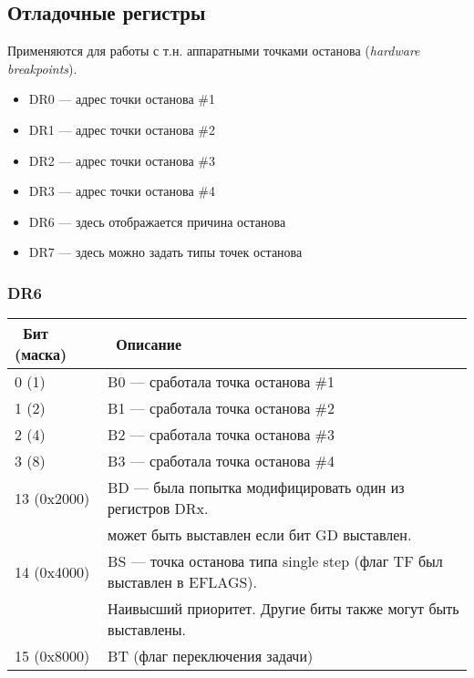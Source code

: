\subsection{Отладочные регистры}

Применяются для работы с т.н. аппаратными точками останова (\textit{hardware breakpoints}).

\begin{itemize}
	\item DR0 --- адрес точки останова \#1
	\item DR1 --- адрес точки останова \#2
	\item DR2 --- адрес точки останова \#3
	\item DR3 --- адрес точки останова \#4
	\item DR6 --- здесь отображается причина останова
	\item DR7 --- здесь можно задать типы точек останова
\end{itemize}

\subsubsection{DR6}

\begin{center}
\begin{tabular}{ | l | l | }
\hline
\headercolor\ Бит (маска) &
\headercolor\ Описание \\
\hline
0 (1)       &  B0 --- сработала точка останова \#1 \\
\hline
1 (2)       &  B1 --- сработала точка останова \#2 \\
\hline
2 (4)       &  B2 --- сработала точка останова \#3 \\
\hline
3 (8)       &  B3 --- сработала точка останова \#4 \\
\hline
13 (0x2000) &  BD --- была попытка модифицировать один из регистров DRx. \\
            &  может быть выставлен если бит GD выставлен. \\
\hline
14 (0x4000) &  BS --- точка останова типа single step (флаг TF был выставлен в EFLAGS). \\
	    &  Наивысший приоритет. Другие биты также могут быть выставлены. \\
\hline
15 (0x8000) &  BT (флаг переключения задачи) \\
\hline
\end{tabular}
\end{center}

